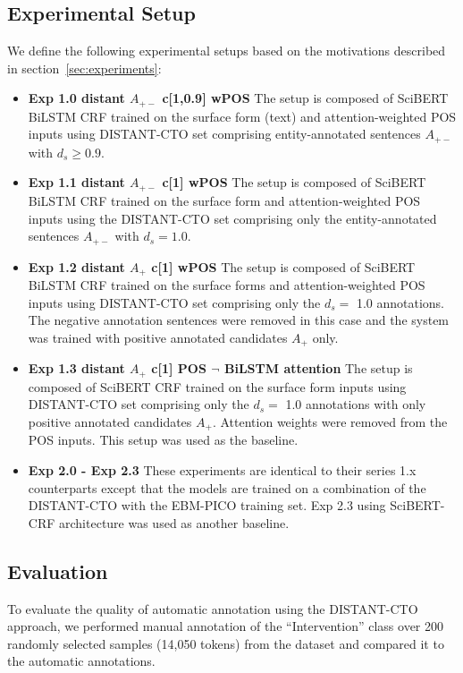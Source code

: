\documentclass[11pt]{article}
\begin{document}
\subsection{Experimental Setup}
\label{subsec:expsetup}
%
We define the following experimental setups based on the motivations described in section~\ref{sec:experiments}:
\begin{itemize}
\item \textbf{Exp 1.0 distant $A_{+-}$ c[1,0.9] wPOS} The setup is composed of SciBERT BiLSTM CRF trained on the surface form (text) and attention-weighted POS inputs using DISTANT-CTO set comprising entity-annotated sentences $A_{+-}$ with $d_s \geq 0.9$.
    \item \textbf{Exp 1.1 distant $A_{+-}$ c[1] wPOS} The setup is composed of SciBERT BiLSTM CRF trained on the surface form and attention-weighted POS inputs using the DISTANT-CTO set comprising only the entity-annotated sentences $A_{+-}$ with $d_s = 1.0$.
    \item \textbf{Exp 1.2 distant $A_{+}$ c[1] wPOS} The setup is composed of SciBERT BiLSTM CRF trained on the surface forms and attention-weighted POS inputs using DISTANT-CTO set comprising only the $d_s =$ 1.0 annotations. The negative annotation sentences were removed in this case and the system was trained with positive annotated candidates $A_{+}$ only.
    \item \textbf{Exp 1.3 distant $A_{+}$ c[1] POS $\neg$ BiLSTM attention } The setup is composed of SciBERT CRF trained on the surface form inputs using DISTANT-CTO set comprising only the $d_s =$ 1.0 annotations with only positive annotated candidates $A_{+}$. Attention weights were removed from the POS inputs. This setup was used as the baseline.
    \item \textbf{Exp 2.0 - Exp 2.3 } These experiments are identical to their series 1.x counterparts except that the models are trained on a combination of the DISTANT-CTO with the EBM-PICO training set. Exp 2.3 using SciBERT-CRF architecture was used as another baseline.
\end{itemize}
%
%
%
\subsection{Evaluation}
\label{subsec:eval}
%
To evaluate the quality of automatic annotation using the DISTANT-CTO approach, we performed manual annotation of the ``Intervention'' class over 200 randomly selected samples (14,050 tokens) from the dataset and compared it to the automatic annotations.
\end{document}

